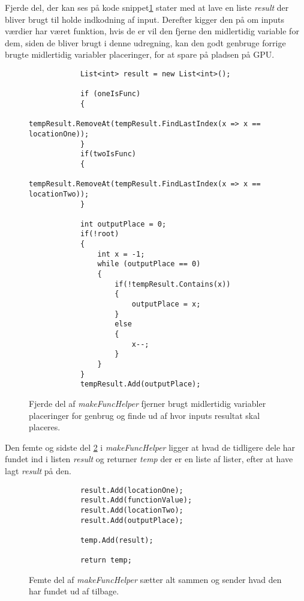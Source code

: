Fjerde del, der kan ses på kode snippet\ref{fig:makeFuncHelper_part_4} stater med at lave en liste \textit{result} der bliver brugt til holde indkodning af input. Derefter kigger den på om inputs værdier har været funktion, hvis de er vil den fjerne den midlertidig variable for dem, siden de bliver brugt i denne udregning, kan den godt genbruge forrige brugte midlertidig variabler placeringer, for at spare på pladsen på GPU.

\begin{figure}[!ht]
    \centering
    \lstset{style=sharpc}
	\begin{lstlisting}
            List<int> result = new List<int>();

            if (oneIsFunc)
            {
                tempResult.RemoveAt(tempResult.FindLastIndex(x => x == locationOne));
            }
            if(twoIsFunc)
            {
                tempResult.RemoveAt(tempResult.FindLastIndex(x => x == locationTwo));
            }

            int outputPlace = 0;
            if(!root)
            { 
                int x = -1;
                while (outputPlace == 0)
                {
                    if(!tempResult.Contains(x))
                    {
                        outputPlace = x;
                    }
                    else
                    {
                        x--;
                    }
                }
            }
            tempResult.Add(outputPlace);
	\end{lstlisting}
    \caption{Fjerde del af \textit{makeFuncHelper} fjerner brugt midlertidig variabler placeringer for genbrug og finde ud af hvor inputs resultat skal placeres.}
    \label{fig:makeFuncHelper_part_4}
\end{figure}

Den femte og sidste del \ref{fig:makeFuncHelper_part_5} i \textit{makeFuncHelper} ligger at hvad de tidligere dele har fundet ind i listen \textit{result} og returner \textit{temp}  der er en liste af lister, efter at have lagt \textit{result} på den.

\begin{figure}[!ht]
    \centering
    \lstset{style=sharpc}
	\begin{lstlisting}
            result.Add(locationOne);
            result.Add(functionValue);
            result.Add(locationTwo);
            result.Add(outputPlace);

            temp.Add(result);

            return temp;
	\end{lstlisting}
    \caption{Femte del af \textit{makeFuncHelper} sætter alt sammen og sender hvad den har fundet ud af tilbage.}
    \label{fig:makeFuncHelper_part_5}
\end{figure}

